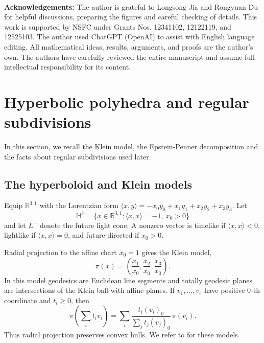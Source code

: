 \documentclass[oneside,a4paper,12pt]{article}
\newcommand{\R}{\mathbb R}
\renewcommand{\H}{\mathbb{H}}
\theoremstyle{plain}
\theoremstyle{definition}
\theoremstyle{remark}
\numberwithin{equation}{section}
\begin{document}
~

\noindent
\textbf{Acknowledgements:}
The author is grateful to Longsong Jia and Rongyuan Du for helpful discussions, preparing the figures and careful checking of details. This work is supported by NSFC under Grants Nos. 12341102, 12122119, and 12525103. The author used ChatGPT (OpenAI) to assist with English language editing. All mathematical ideas, results, arguments, and proofs are the author's own. The authors have carefully reviewed the entire manuscript and assume full intellectual responsibility for its content.


\section{Hyperbolic polyhedra and regular subdivisions}\label{section:preliminaries}

In this section, we recall the Klein model, the Epstein-Penner decomposition and the facts about regular subdivisions used later.

\subsection{The hyperboloid and Klein models}
Equip $\R^{3,1}$ with the Lorentzian form $\langle x,y\rangle=-x_0y_0+x_1y_1+x_2y_2+x_3y_3$. Let
\begin{equation}
\H^3=\{x\in\R^{3,1}:\langle x,x\rangle=-1,\ x_0>0\}
  \nonumber \end{equation}
and let $L^+$ denote the future light cone. A nonzero vector is timelike if $\langle x,x\rangle<0$, lightlike if $\langle x,x\rangle=0$, and future-directed if $x_0>0$.

Radial projection to the affine chart $x_0=1$ gives the Klein model,
\begin{equation}\label{equation:klein-projection-prelim}
\pi(x)=\left(\frac{x_1}{x_0},\frac{x_2}{x_0},\frac{x_3}{x_0}\right).
\end{equation}
In this model geodesics are Euclidean line segments and totally geodesic planes are intersections of the Klein ball with affine planes. If $v_1,\ldots,v_r$ have positive $0$-th coordinate and $t_i\geq0$, then
\begin{equation}\label{equation:radial-convexity-prelim}
\pi\!\left(\sum_i t_iv_i\right)
 =\sum_i\frac{t_i(v_i)_0}{\sum_jt_j(v_j)_0}\,\pi(v_i).
\end{equation}
Thus radial projection preserves convex hulls. We refer to \cite{BenedettiPetronio} for these models.
\end{document}
